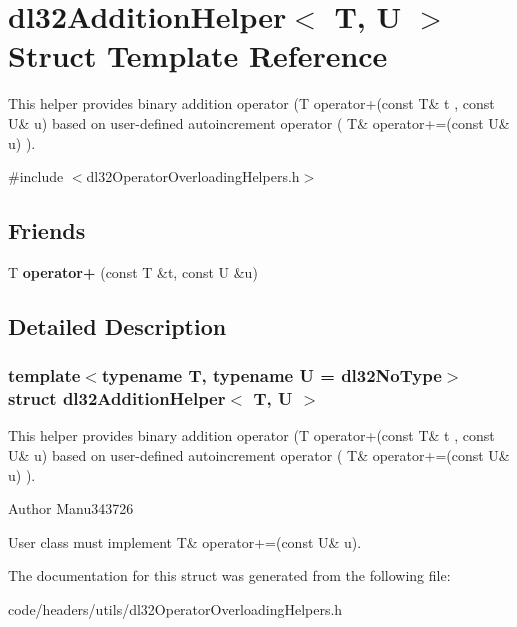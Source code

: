 \hypertarget{structdl32_addition_helper}{\section{dl32\-Addition\-Helper$<$ T, U $>$ Struct Template Reference}
\label{structdl32_addition_helper}
}


This helper provides binary addition operator (T operator+(const T\& t , const U\& u) based on user-\/defined autoincrement operator ( T\& operator+=(const U\& u) ).  




{\ttfamily \#include $<$dl32\-Operator\-Overloading\-Helpers.\-h$>$}

\subsection*{Friends}
\begin{DoxyCompactItemize}
\item 
\hypertarget{structdl32_addition_helper_a43dde7b2d9540bc6beb8cc4f0288ed63}{T {\bfseries operator+} (const T \&t, const U \&u)}\label{structdl32_addition_helper_a43dde7b2d9540bc6beb8cc4f0288ed63}

\end{DoxyCompactItemize}


\subsection{Detailed Description}
\subsubsection*{template$<$typename T, typename U = dl32\-No\-Type$>$struct dl32\-Addition\-Helper$<$ T, U $>$}

This helper provides binary addition operator (T operator+(const T\& t , const U\& u) based on user-\/defined autoincrement operator ( T\& operator+=(const U\& u) ). 

\begin{DoxyAuthor}{Author}
Manu343726
\end{DoxyAuthor}
User class must implement T\& operator+=(const U\& u). 

The documentation for this struct was generated from the following file\-:\begin{DoxyCompactItemize}
\item 
code/headers/utils/dl32\-Operator\-Overloading\-Helpers.\-h\end{DoxyCompactItemize}
